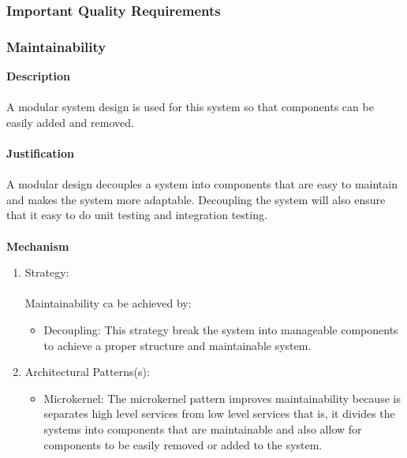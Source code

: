 \documentclass[hidelinks, 12pt, oneside]{article}
\begin{document}
		\subsubsection{Important Quality Requirements}
			\subsubsection*{Maintainability}
			\textbf{Description}\\\\
			A modular system design is used for this system so that components can be easily added and removed.\\\\
			\textbf{Justification}\\\\
			A modular design decouples a system into components that are easy to maintain and makes the system more adaptable. Decoupling the system will also ensure that it easy to do unit testing and integration testing.\\\\
			\textbf{Mechanism}
			\begin{enumerate}
				\item Strategy:\\\\
				Maintainability ca be achieved by:
				\begin{itemize}
				\item Decoupling: This strategy break the system into manageable components to achieve a proper structure and maintainable system.  
				\end{itemize}
				\item Architectural Patterns(s):
				\begin{itemize}
				\item Microkernel: The microkernel pattern improves maintainability because is separates high level services  from low level services that is, it divides the systems into components that are maintainable and also allow for components to be easily removed or added to the system.
				\end{itemize}
			\end{enumerate}
			\newpage
\end{document}
